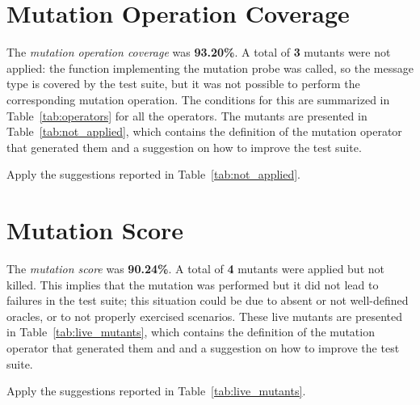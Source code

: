 \section{Mutation Operation Coverage}

The \emph{mutation operation coverage} was \textbf{93.20\%}. A total of \textbf{3} mutants were not applied: the function implementing the mutation probe was called, so the message type is covered by the test suite, but it was not possible to perform the corresponding mutation operation.
The conditions for this are summarized in Table~\ref{tab:operators} for all the operators.
The mutants are presented in Table~\ref{tab:not_applied}, which contains the definition of the mutation operator that generated them and a suggestion on how to improve the test suite.

\action Apply the suggestions reported in Table~\ref{tab:not_applied}.

 


\section{Mutation Score}

 The \emph{mutation score} was \textbf{90.24\%}. A total of \textbf{4} mutants were applied but not killed. This implies that the mutation was performed but it did not lead to failures in the test suite; this situation could be due to absent or not well-defined oracles, or to not properly exercised scenarios.
 These live mutants are presented in Table~\ref{tab:live_mutants}, which contains the definition of the mutation operator that generated them and and a suggestion on how to improve the test suite.

\action Apply the suggestions reported in Table~\ref{tab:live_mutants}.


